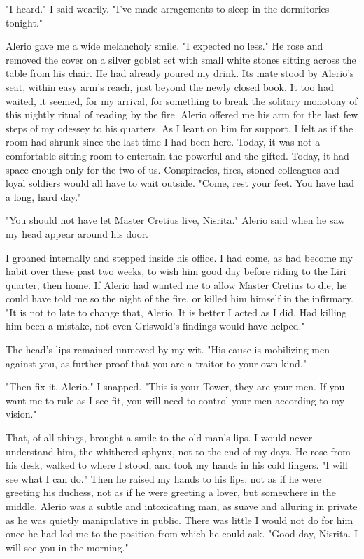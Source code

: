 \documentclass{article}
\begin{document}
"I heard." I said wearily. "I've made arragements to sleep in the dormitories tonight."

Alerio gave me a wide melancholy smile. "I expected no less." He rose and removed the cover on a silver goblet set with small white stones sitting across the table from his chair. He had already poured my drink. Its mate stood by Alerio's seat, within easy arm's reach, just beyond the newly closed book. It too had waited, it seemed, for my arrival, for something to break the solitary monotony of this nightly ritual of reading by the fire. Alerio offered me his arm for the last few steps of my odessey to his quarters. As I leant on him for support, I felt as if the room had shrunk since the last time I had been here. Today, it was not a comfortable sitting room to entertain the powerful and the gifted. Today, it had space enough only for the two of us. Conspiracies, fires, stoned colleagues and loyal soldiers would all have to wait outside. "Come, rest your feet. You have had a long, hard day."

\vspace{.5cm}

"You should not have let Master Cretius live, Nisrita." Alerio said when he saw my head appear around his door.

I groaned internally and stepped inside his office. I had come, as had become my habit over these past two weeks, to wish him good day before riding to the Liri quarter, then home. If Alerio had wanted me to allow Master Cretius to die, he could have told me so the night of the fire, or killed him himself in the infirmary. "It is not to late to change that, Alerio. It is better I acted as I did. Had killing him been a mistake, not even Griswold's findings would have helped."

The head's lips remained unmoved by my wit. "His cause is mobilizing men against you, as further proof that you are a traitor to your own kind."

"Then fix it, Alerio." I snapped. "This is your Tower, they are your men. If you want me to rule as I see fit, you will need to control your men according to my vision."

That, of all things, brought a smile to the old man's lips. I would never understand him, the whithered sphynx, not to the end of my days. He rose from his desk, walked to where I stood, and took my hands in his cold fingers. "I will see what I can do." Then he raised my hands to his lips, not as if he were greeting his duchess, not as if he were greeting a lover, but somewhere in the middle. Alerio was a subtle and intoxicating man, as suave and alluring in private as he was quietly manipulative in public. There was little I would not do for him once he had led me to the position from which he could ask. "Good day, Nisrita. I will see you in the morning."
\end{document}
